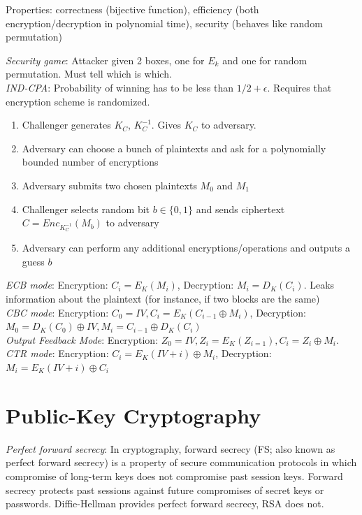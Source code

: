 \documentclass[10pt,landscape]{article}
\begin{document}
\begin{multicols}{3}
Properties: correctness (bijective function), efficiency (both encryption/decryption in polynomial time), security (behaves like random permutation)

\textit{Security game}: Attacker given 2 boxes, one for $E_k$ and one for random permutation. Must tell which is which. \\
\textit{IND-CPA}: Probability of winning has to be less than $1/2 + \epsilon$. Requires that encryption scheme is randomized.

\begin{enumerate}
    \item Challenger generates $K_C$, $K_C^{-1}$. Gives $K_C$ to adversary.
    \item Adversary can choose a bunch of plaintexts and ask for a polynomially bounded number of encryptions
    \item Adversary submits two chosen plaintexts $M_0$ and $M_1$
    \item Challenger selects random bit $b\in\{0, 1\}$ and sends ciphertext $C=Enc_{K_C^{-1}}(M_b)$ to adversary
    \item Adversary can perform any additional encryptions/operations and outputs a guess $b$
\end{enumerate}

\textit{ECB mode}: Encryption: $C_i = E_K(M_i)$, Decryption: $M_i = D_K(C_i)$. Leaks information about the plaintext (for instance, if two blocks are the same) \\
\textit{CBC mode}: Encryption: $C_0 = IV, C_i = E_K(C_{i-1} \oplus M_i)$, Decryption: $M_0 = D_K(C_0) \oplus IV, M_i = C_{i-1} \oplus D_K(C_i)$ \\
\textit{Output Feedback Mode}: Encryption: $Z_0 = IV, Z_i = E_K(Z_{i=1}), C_i = Z_i \oplus M_i$. \\
\textit{CTR mode}: Encryption: $C_i = E_K(IV + i) \oplus M_i$, Decryption: $M_i = E_K(IV + i) \oplus C_i$

\section{Public-Key Cryptography}

\textit{Perfect forward secrecy}: In cryptography, forward secrecy (FS; also known as perfect forward secrecy) is a property of secure communication protocols in which compromise of long-term keys does not compromise past session keys. Forward secrecy protects past sessions against future compromises of secret keys or passwords. Diffie-Hellman provides perfect forward secrecy, RSA does not.


\end{multicols}
\end{document}

